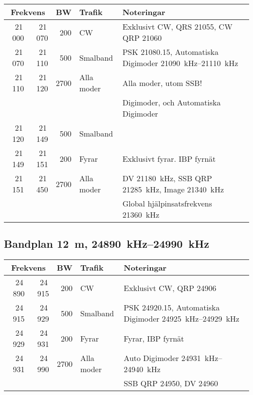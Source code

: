 \begin{tabular}{rrrll}
\multicolumn{2}{c}{\textbf{Frekvens}} & \textbf{BW} & \textbf{Trafik} & \textbf{Noteringar} \\ \hline

21\,000 & 21\,070 & 200  & CW         & Exklusivt CW, QRS \num{21055}, CW QRP \num{21060}                                          \\ \hline
21\,070 & 21\,110 & 500  & Smalband   & PSK \num{21080,15}, Automatiska Digimoder \SIrange{21090}{21110}{\kilo\hertz}              \\ \hline
21\,110 & 21\,120 & 2700 & Alla moder & Alla moder, utom SSB! \\
        &         &      &            & Digimoder, och Automatiska Digimoder \\ \hline
21\,120 & 21\,149 & 500  & Smalband   &                                       \\ \hline
21\,149 & 21\,151 & 200  & Fyrar      & Exklusivt fyrar. IBP fyrnät           \\ \hline
21\,151 & 21\,450 & 2700 & Alla moder & DV \qty{21180}{\kilo\hertz}, SSB QRP \qty{21285}{\kilo\hertz}, Image \qty{21340}{\kilo\hertz} \\
        &         &      &            & Global hjälpinsatsfrekvens \qty{21360}{\kilo\hertz} \\
\end{tabular}

\subsection{Bandplan \qty{12}{\metre}, \SIrange{24890}{24990}{\kilo\hertz}}
\begin{tabular}{rrrll}
\multicolumn{2}{c}{\textbf{Frekvens}} & \textbf{BW} & \textbf{Trafik} & \textbf{Noteringar} \\ \hline

24\,890 & 24\,915 & 200  & CW         & Exklusivt CW, QRP \num{24906}                      \\ \hline
24\,915 & 24\,929 & 500  & Smalband   & PSK \num{24920,15}, Automatiska
                                        Digimoder \SIrange{24925}{24929}{\kilo\hertz}      \\ \hline
24\,929 & 24\,931 & 200  & Fyrar      & Fyrar, IBP fyrnät                                  \\ \hline
24\,931 & 24\,990 & 2700 & Alla moder & Auto Digimoder \SIrange{24931}{24940}{\kilo\hertz} \\
        &         &      &            & SSB QRP \num{24950}, DV \num{24960}                \\
\end{tabular}

